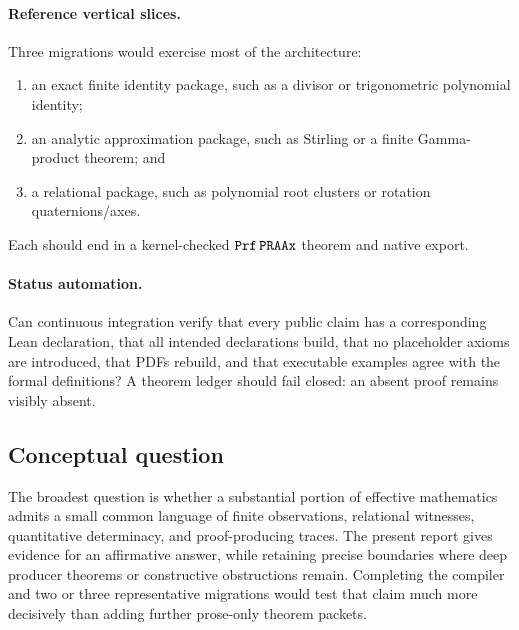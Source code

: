 \paragraph{Reference vertical slices.}
Three migrations would exercise most of the architecture:

\begin{enumerate}
\item an exact finite identity package, such as a divisor or trigonometric
      polynomial identity;
\item an analytic approximation package, such as Stirling or a finite
      Gamma-product theorem; and
\item a relational package, such as polynomial root clusters or rotation
      quaternions/axes.
\end{enumerate}

Each should end in a kernel-checked \(\texttt{Prf}\,\texttt{PRAAx}\) theorem and native export.

\paragraph{Status automation.}
Can continuous integration verify that every public claim has a corresponding
Lean declaration, that all intended declarations build, that no placeholder
axioms are introduced, that PDFs rebuild, and that executable examples agree
with the formal definitions?  A theorem ledger should fail closed: an absent
proof remains visibly absent.

\subsection{Conceptual question}

The broadest question is whether a substantial portion of effective
mathematics admits a small common language of finite observations, relational
witnesses, quantitative determinacy, and proof-producing traces.  The present
report gives evidence for an affirmative answer, while retaining precise
boundaries where deep producer theorems or constructive obstructions remain.
Completing the compiler and two or three representative migrations would test
that claim much more decisively than adding further prose-only theorem packets.
